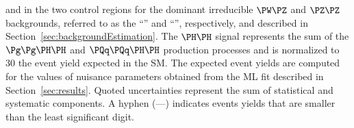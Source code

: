 \begin{table}[!h]
{  and in the two control regions for the dominant irreducible $\PW\PZ$ and $\PZ\PZ$ backgrounds,
  referred to as the ``\threeLeptonCR'' and ``\fourLeptonCR'', respectively, and described in Section~\ref{sec:backgroundEstimation}.
  The $\HH$ signal represents the sum of the $\ggHH$ and $\qqHH$ production processes and is normalized to $30$ the event yield expected in the SM.
  The expected event yields are computed for the values of nuisance parameters obtained from the ML fit described in Section~\ref{sec:results}.
  Quoted uncertainties represent the sum of statistical and systematic components. 
  A hyphen (—) indicates events yields that are smaller than the least significant digit.
}
\label{tab:event_yields}
\end{table}

